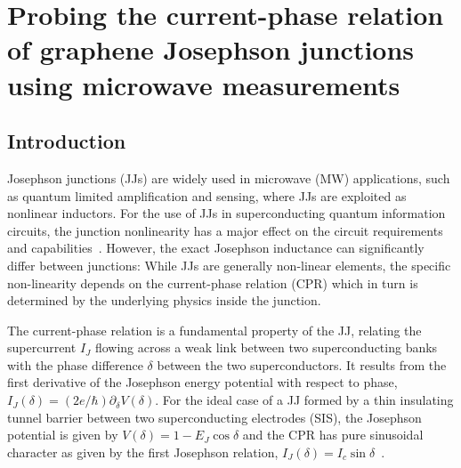 \newchapstyle
\chapter{Probing the current-phase relation of graphene Josephson junctions using microwave measurements}
\label{chap:gJJ-CPR}


\begin{abstract}
	We perform extensive analysis of graphene Josephson junctions embedded in microwave circuits.
	By comparing a diffusive junction at \SI{15}{\milli\kelvin} with a ballistic one at \SI{15}{\milli\kelvin} and \SI{1}{\kelvin}, we are able to reconstruct the current-phase relation.
\end{abstract}

\afterpage{\pagecolor{none}}\newpage

\section{Introduction}

Josephson junctions (JJs) are widely used in microwave (MW) applications, such as quantum limited amplification and sensing, where JJs are exploited as nonlinear inductors.
%
For the use of JJs in superconducting quantum information circuits, the junction nonlinearity has a major effect on the circuit requirements and capabilities~\cite{kringhojAnharmonicitySuperconductingQubit2018}.
%
However, the exact Josephson inductance can significantly differ between junctions:
%
While JJs are generally non-linear elements, the specific non-linearity depends on the current-phase relation (CPR) which in turn is determined by the underlying physics inside the junction.

The current-phase relation is a fundamental property of the JJ, relating the supercurrent $I_J$ flowing across a weak link between two superconducting banks with the phase difference $\delta$ between the two superconductors.
%
It results from the first derivative of the Josephson energy potential with respect to phase, $I_J(\delta) = (2e/\hbar) \partial_\delta V(\delta)$.
%
For the ideal case of a JJ formed by a thin insulating tunnel barrier between two superconducting electrodes (SIS), the Josephson potential is given by $V(\delta)=1-E_J\cos\delta$ and the CPR has pure sinusoidal character as given by the first Josephson relation, $I_J(\delta) = I_c\sin\delta$~\cite{josephsonPossibleNewEffects1962,josephsonSupercurrentsBarriers1965}.

